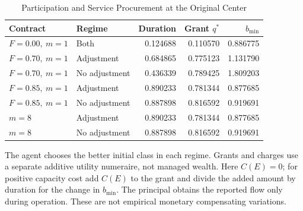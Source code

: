 \begin{table}[tbp]
\centering\small
\caption{Participation and Service Procurement at the Original Center}
\label{tab:r9_procurement}
\begin{tabular}{llrrr}
\toprule
Contract & Regime & Duration & Grant $q^*$ & $b_{\min}$ \\
\midrule
$F=0.00,\ m=1$ & Both & 0.124688 & 0.110570 & 0.886775 \\
$F=0.70,\ m=1$ & Adjustment & 0.684865 & 0.775123 & 1.131790 \\
$F=0.70,\ m=1$ & No adjustment & 0.436339 & 0.789425 & 1.809203 \\
$F=0.85,\ m=1$ & Adjustment & 0.890233 & 0.781344 & 0.877685 \\
$F=0.85,\ m=1$ & No adjustment & 0.887898 & 0.816592 & 0.919691 \\
$m=8$ & Adjustment & 0.890233 & 0.781344 & 0.877685 \\
$m=8$ & No adjustment & 0.887898 & 0.816592 & 0.919691 \\
\bottomrule
\end{tabular}
\begin{minipage}{0.98\textwidth}\footnotesize\medskip
The agent chooses the better initial class in each regime. Grants and charges use a separate additive utility numeraire, not managed wealth. Here $C(E)=0$; for positive capacity cost add $C(E)$ to the grant and divide the added amount by duration for the change in $b_{\min}$. The principal obtains the reported flow only during operation. These are not empirical monetary compensating variations.
\end{minipage}
\end{table}
